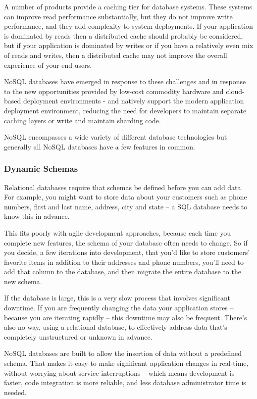 \documentclass[12pt]{article}
\begin{document}
A number of products provide a caching tier for database systems. These systems can improve read performance substantially, but they do not improve write performance, and they add complexity to system deployments. If your application is dominated by reads then a distributed cache should probably be considered, but if your application is dominated by writes or if you have a relatively even mix of reads and writes, then a distributed cache may not improve the overall experience of your end users.

NoSQL databases have emerged in response to these challenges and in response to the new opportunities provided by low-cost commodity hardware and cloud-based deployment environments - and natively support the modern application deployment environment, reducing the need for developers to maintain separate caching layers or write and maintain sharding code.


NoSQL encompasses a wide variety of different database technologies but generally all NoSQL databases have a few features in common.

\subsubsection{Dynamic Schemas}

Relational databases require that schemas be defined before you can add data. For example, you might want to store data about your customers such as phone numbers, first and last name, address, city and state – a SQL database needs to know this in advance.

This fits poorly with agile development approaches, because each time you complete new features, the schema of your database often needs to change. So if you decide, a few iterations into development, that you'd like to store customers' favorite items in addition to their addresses and phone numbers, you'll need to add that column to the database, and then migrate the entire database to the new schema.

If the database is large, this is a very slow process that involves significant downtime. If you are frequently changing the data your application stores – because you are iterating rapidly – this downtime may also be frequent. There's also no way, using a relational database, to effectively address data that's completely unstructured or unknown in advance.

NoSQL databases are built to allow the insertion of data without a predefined schema. That makes it easy to make significant application changes in real-time, without worrying about service interruptions – which means development is faster, code integration is more reliable, and less database administrator time is needed.
\end{document}
